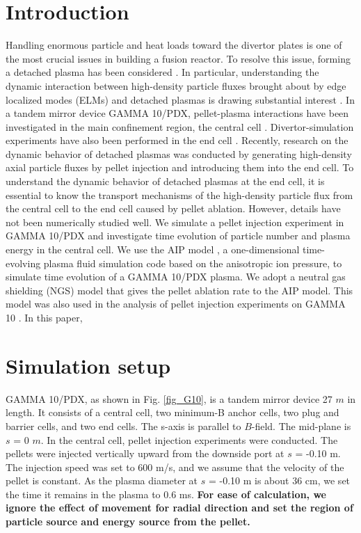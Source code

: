 \documentclass{jasse}%
\begin{document}
\section{Introduction}
    Handling enormous particle and heat loads toward the divertor plates is one of the most crucial issues in building a fusion reactor. To resolve this issue, forming a detached plasma has been considered \cite{leonard18,ohno17}. In particular, understanding the dynamic interaction between high-density particle fluxes brought about by edge localized modes (ELMs) and detached plasmas is drawing substantial interest \cite{ohno17,loarte07}. In a tandem mirror device GAMMA 10/PDX, pellet-plasma interactions have been investigated in the main confinement region, the central cell \cite{kubota07,yoshikawa22,yoshikawa24}. Divertor-simulation experiments have also been performed in the end cell \cite{nakashima17,ezumi19}. Recently, research on the dynamic behavior of detached plasmas was conducted by generating high-density axial particle fluxes by pellet injection and introducing them into the end cell. To understand the dynamic behavior of detached plasmas at the end cell, it is essential to know the transport mechanisms of the high-density particle flux from the central cell to the end cell caused by pellet ablation. However, details have not been numerically studied well. We simulate a pellet injection experiment in GAMMA 10/PDX and investigate time evolution of particle number and plasma energy in the central cell. We use the AIP model \cite{togo22,togo19}, a one-dimensional time-evolving plasma fluid simulation code based on the anisotropic ion pressure, to simulate time evolution of a GAMMA 10/PDX plasma. We adopt a neutral gas shielding (NGS) model \cite{nakamura86} that gives the pellet ablation rate to the AIP model. This model was also used in the analysis of pellet injection experiments on GAMMA 10 \cite{kubota07}.
    In this paper, 

\section{Simulation setup}
    GAMMA 10/PDX, as shown in Fig. \ref{fig_G10}, is a tandem mirror device 27 $m$ in length. It consists of a central cell, two minimum-B anchor cells, two plug and barrier cells, and two end cells. The s-axis is parallel to $B$-field. The mid-plane is $s$ = 0 $m$. In the central cell, pellet injection experiments were conducted.
    The pellets were injected vertically upward from the downside port at $s$ = -0.10 m. The injection speed was set to 600 m/s, and we assume that the velocity of the pellet is constant. As the plasma diameter at  $s$ = -0.10 m is about 36 cm, we set the time it remains in the plasma to 0.6 ms. \textbf{For ease of calculation, we ignore the effect of movement for radial direction and set the region of particle source and energy source from the pellet.}
\end{document}
